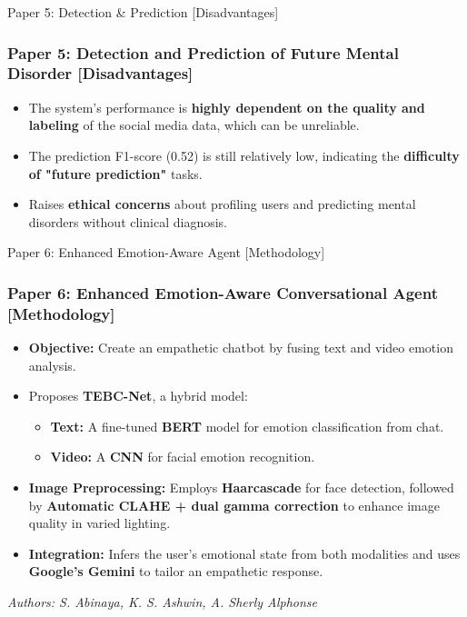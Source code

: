 \documentclass[11pt]{beamer}
\begin{document}
\begin{frame}{Paper 5: Detection \& Prediction [Disadvantages]}
\frametitle{Paper 5: Detection and Prediction of Future Mental Disorder [Disadvantages]}
\begin{itemize}
    \item The system's performance is \textbf{highly dependent on the quality and labeling} of the social media data, which can be unreliable.
    \item The prediction F1-score (0.52) is still relatively low, indicating the \textbf{difficulty of "future prediction"} tasks.
    \item Raises \textbf{ethical concerns} about profiling users and predicting mental disorders without clinical diagnosis.
\end{itemize}
\end{frame}

\begin{frame}{Paper 6: Enhanced Emotion-Aware Agent [Methodology]}
\frametitle{Paper 6: Enhanced Emotion-Aware Conversational Agent [Methodology]}
\begin{itemize}
    \item \textbf{Objective:} Create an empathetic chatbot by fusing text and video emotion analysis.
    \item Proposes \textbf{TEBC-Net}, a hybrid model:
    \begin{itemize}
        \item \textbf{Text:} A fine-tuned \textbf{BERT} model for emotion classification from chat.
        \item \textbf{Video:} A \textbf{CNN} for facial emotion recognition.
    \end{itemize}
    \item \textbf{Image Preprocessing:} Employs \textbf{Haarcascade} for face detection, followed by \textbf{Automatic CLAHE + dual gamma correction} to enhance image quality in varied lighting.
    \item \textbf{Integration:} Infers the user's emotional state from both modalities and uses \textbf{Google's Gemini} to tailor an empathetic response.
\end{itemize}
\vfill
\small{\textit{Authors: S. Abinaya, K. S. Ashwin, A. Sherly Alphonse}}
\end{frame}
\end{document}
